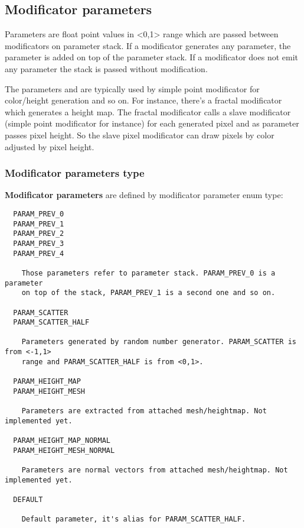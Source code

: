 \documentclass[9pt]{article}
\begin{document}
\subsection{Modificator parameters}

Parameters are float point values in <0,1> range which are passed between
modificators on parameter stack. If a modificator generates any parameter, the
parameter is added on top of the parameter stack. If a modificator does not
emit any parameter the stack is passed without modification.

The parameters and are typically used by simple point modificator 
for color/height generation and so on. For instance, there's a fractal
modificator which generates a height map. The fractal modificator calls
a slave modificator (simple point modificator for instance) for each generated 
pixel and as parameter passes pixel height. So the slave pixel modificator can 
draw pixels by color adjusted by pixel height.

\subsubsection{Modificator parameters type}

{\bf Modificator parameters} are defined by modificator parameter enum type:

\begin{verbatim}
  PARAM_PREV_0
  PARAM_PREV_1
  PARAM_PREV_2
  PARAM_PREV_3
  PARAM_PREV_4

    Those parameters refer to parameter stack. PARAM_PREV_0 is a parameter
    on top of the stack, PARAM_PREV_1 is a second one and so on.
  
  PARAM_SCATTER
  PARAM_SCATTER_HALF
  
    Parameters generated by random number generator. PARAM_SCATTER is from <-1,1>
    range and PARAM_SCATTER_HALF is from <0,1>.
    
  PARAM_HEIGHT_MAP
  PARAM_HEIGHT_MESH
  
    Parameters are extracted from attached mesh/heightmap. Not implemented yet.
    
  PARAM_HEIGHT_MAP_NORMAL
  PARAM_HEIGHT_MESH_NORMAL
  
    Parameters are normal vectors from attached mesh/heightmap. Not implemented yet.
  
  DEFAULT
  
    Default parameter, it's alias for PARAM_SCATTER_HALF.  
\end{verbatim}
\end{document}
